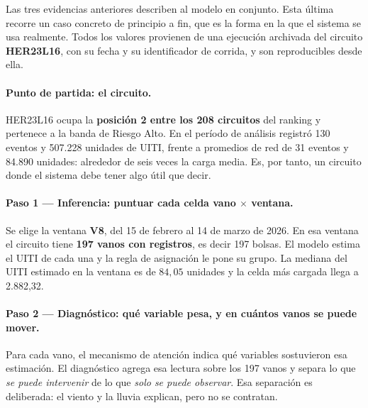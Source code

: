 \documentclass[11pt,a4paper]{article}
\begin{document}
\begin{bloquenuevo}
Las tres evidencias anteriores describen al modelo en conjunto. Esta última recorre un caso
concreto de principio a fin, que es la forma en la que el sistema se usa realmente. Todos los
valores provienen de una ejecución archivada del circuito \textbf{HER23L16}, con su fecha y su
identificador de corrida, y son reproducibles desde ella.

\paragraph{Punto de partida: el circuito.} HER23L16 ocupa la \textbf{posición 2 entre los 208
circuitos} del ranking y pertenece a la banda de Riesgo Alto. En el período de análisis registró
130 eventos y 507.228 unidades de UITI, frente a promedios de red de 31 eventos y 84.890
unidades: alrededor de seis veces la carga media. Es, por tanto, un circuito donde el sistema
debe tener algo útil que decir.

\paragraph{Paso 1 --- Inferencia: puntuar cada celda vano $\times$ ventana.} Se elige la ventana
\textbf{V8}, del 15 de febrero al 14 de marzo de 2026. En esa ventana el circuito tiene
\textbf{197 vanos con registros}, es decir 197 bolsas. El modelo estima el UITI de cada una y la
regla de asignación le pone su grupo. La mediana del UITI estimado en la ventana es de
$84{,}05$ unidades y la celda más cargada llega a 2.882,32.

\paragraph{Paso 2 --- Diagnóstico: qué variable pesa, y en cuántos vanos se puede mover.} Para
cada vano, el mecanismo de atención indica qué variables sostuvieron esa estimación. El
diagnóstico agrega esa lectura sobre los 197 vanos y separa lo que \emph{se puede intervenir}
de lo que \emph{solo se puede observar}. Esa separación es deliberada: el viento y la lluvia
explican, pero no se contratan.


\end{bloquenuevo}
\end{document}
